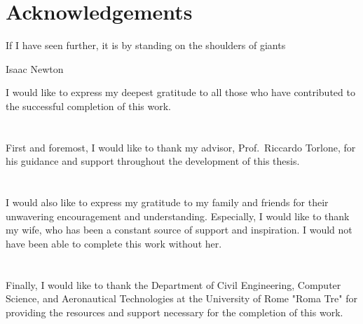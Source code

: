 
\chapter*{Acknowledgements}
\label{ch:acknowledgements}
\epigraph{If I have seen further, it is by standing on the shoulders of giants}{Isaac Newton}

I would like to express my deepest gratitude to all those who have contributed to the successful completion of this work.\\
\\
\\
First and foremost, I would like to thank my advisor, Prof.\ Riccardo Torlone, for his guidance and support throughout the development of this thesis.\\
\\
\\
I would also like to express my gratitude to my family and friends for their unwavering encouragement and understanding.
Especially, I would like to thank my wife, who has been a constant source of support and inspiration.
I would not have been able to complete this work without her.\\
\\
\\
Finally, I would like to thank the Department of Civil Engineering, Computer Science, and Aeronautical Technologies at the University of Rome "Roma Tre" for providing the resources and support necessary for the completion of this work.

\thispagestyle{fancy}
\fancyhf{}
\renewcommand{\headrulewidth}{0pt} %
